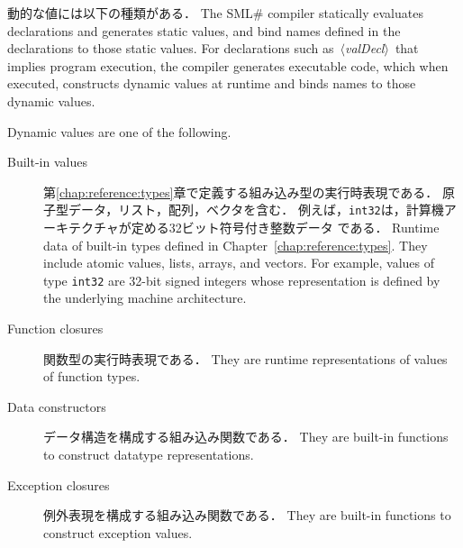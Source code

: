 \documentclass{jbook}
\newcommand{\txt}[2]{#2}
\newcommand{\smlsharp}{SML\#}
\newcommand{\code}[1]{\mbox{\large\tt #1}}
\newcommand{\nonterm}[1]{\mbox{$\,\langle$}{\it #1}\mbox{$\rangle\,$}}
\begin{document}
	動的な値には以下の種類がある．
\else%
	The \smlsharp{} compiler statically evaluates declarations and
generates static values, and bind names defined in the declarations
to those static values.
	For declarations such as \nonterm{valDecl} that implies program
execution, the compiler generates executable code, which when executed,
constructs dynamic values at runtime and binds names to those dynamic
values. 

	Dynamic values are one of the following.
\fi%

\begin{description}
\item[\txt{組み込みデータ}{Built-in values}] 
\ifjp%
	第\ref{chap:reference:types}章で定義する組み込み型の実行時表現である．
	原子型データ，リスト，配列，ベクタを含む．
	例えば，\code{int32}は，計算機アーキテクチャが定める32ビット符号付き整数データ
である．
\else%
	Runtime data of built-in types defined in Chapter~\ref{chap:reference:types}.
	They include atomic values, lists, arrays, and vectors.
	For example, values of type \code{int32} are 32-bit signed
integers whose representation is defined by the underlying machine
architecture.

\fi%
\item[\txt{関数クロージャ}{Function closures}]
\ifjp%
	関数型の実行時表現である．
\else%
	They are runtime representations of values of function types.
\fi%

\item[\txt{データ構成子}{Data constructors}]
\ifjp%
	データ構造を構成する組み込み関数である．
\else%
	They are built-in functions to construct datatype representations.
\fi%

\item[\txt{例外構成子}{Exception closures}]
\ifjp%
	例外表現を構成する組み込み関数である．
\else%
	They are built-in functions to construct exception values.
\fi%


\end{description}
\end{document}
